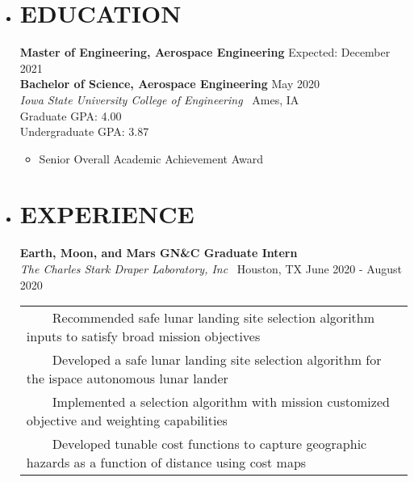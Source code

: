 \documentclass[overlapped, 11pt]{res}
\newcommand{\tabitem}{~~\textbullet~~}
\begin{document}
\address
{
    605 East 16th Street Pella, IA 50219 
    \textbar \ (641) 780-9473 
    \textbar \ carldevries@gmail.com 
}

\begin{resume}

    \begin{itemize}
    
        \item[]\section{EDUCATION}
        
            \textbf{Master of Engineering, Aerospace Engineering} \hfill Expected: December 2021 \\
            \textbf{Bachelor of Science, Aerospace Engineering} \hfill May 2020 \\
            \emph{Iowa State University College of Engineering} \textbar
                \ Ames, IA \\
            Graduate GPA: 4.00 \\
            Undergraduate GPA: 3.87 
            \begin{itemize}
                \item[] Senior Overall Academic Achievement Award
            \end{itemize}
                
           

        \item[]\section{EXPERIENCE}
        
            \textbf{Earth, Moon, and Mars GN\&C Graduate Intern}\\ 
            \emph{The Charles Stark Draper Laboratory, Inc} \textbar 
                \ Houston, TX \hfill June 2020 - August 2020
            \begin{tabular}{l}
                \tabitem Recommended safe lunar landing site selection algorithm inputs to satisfy broad mission objectives \\
                \tabitem Developed a safe lunar landing site selection algorithm for the ispace autonomous lunar lander \\
                \tabitem Implemented a selection algorithm with mission customized objective and weighting capabilities \\
                \tabitem Developed tunable cost functions to capture geographic hazards as a function of distance using cost maps \\
            \end{tabular}
            

\end{itemize}
\end{resume}
\end{document}
